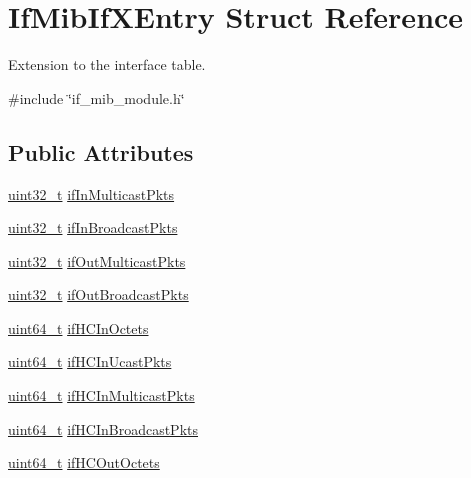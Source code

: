 \hypertarget{structIfMibIfXEntry}{}\section{If\+Mib\+If\+X\+Entry Struct Reference}
\label{structIfMibIfXEntry}


Extension to the interface table.  




{\ttfamily \#include \char`\"{}if\+\_\+mib\+\_\+module.\+h\char`\"{}}

\subsection*{Public Attributes}
\begin{DoxyCompactItemize}
\item 
\hyperlink{stdint_8h_a435d1572bf3f880d55459d9805097f62}{uint32\+\_\+t} \hyperlink{structIfMibIfXEntry_ad90d04ca67b7492232fd63c969ae4215}{if\+In\+Multicast\+Pkts}
\item 
\hyperlink{stdint_8h_a435d1572bf3f880d55459d9805097f62}{uint32\+\_\+t} \hyperlink{structIfMibIfXEntry_aa5d2c35b733dc150d95a7685e7cca09b}{if\+In\+Broadcast\+Pkts}
\item 
\hyperlink{stdint_8h_a435d1572bf3f880d55459d9805097f62}{uint32\+\_\+t} \hyperlink{structIfMibIfXEntry_a59ddb219c11f99577537d7622e8e190c}{if\+Out\+Multicast\+Pkts}
\item 
\hyperlink{stdint_8h_a435d1572bf3f880d55459d9805097f62}{uint32\+\_\+t} \hyperlink{structIfMibIfXEntry_a87cd03861faad96d27e52fe60ddbc6f3}{if\+Out\+Broadcast\+Pkts}
\item 
\hyperlink{stdint_8h_aec6fcb673ff035718c238c8c9d544c47}{uint64\+\_\+t} \hyperlink{structIfMibIfXEntry_afd25a1b57b8b48f44976dceef150ddae}{if\+H\+C\+In\+Octets}
\item 
\hyperlink{stdint_8h_aec6fcb673ff035718c238c8c9d544c47}{uint64\+\_\+t} \hyperlink{structIfMibIfXEntry_a5ec73ef683257906bcdaaa7a7768de22}{if\+H\+C\+In\+Ucast\+Pkts}
\item 
\hyperlink{stdint_8h_aec6fcb673ff035718c238c8c9d544c47}{uint64\+\_\+t} \hyperlink{structIfMibIfXEntry_a4adc41437b9725f2150b07fb29dc76ec}{if\+H\+C\+In\+Multicast\+Pkts}
\item 
\hyperlink{stdint_8h_aec6fcb673ff035718c238c8c9d544c47}{uint64\+\_\+t} \hyperlink{structIfMibIfXEntry_a5194481da5fb7098cf5e78e5c6e7fb1e}{if\+H\+C\+In\+Broadcast\+Pkts}
\item 
\hyperlink{stdint_8h_aec6fcb673ff035718c238c8c9d544c47}{uint64\+\_\+t} \hyperlink{structIfMibIfXEntry_a289f09bab1c357e2ce00c9dbe1c94e20}{if\+H\+C\+Out\+Octets}

\end{DoxyCompactItemize}
